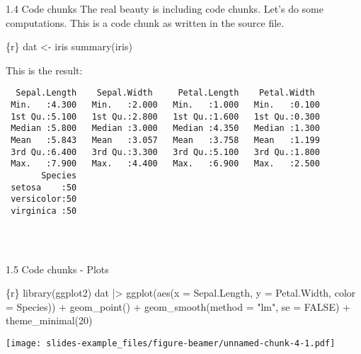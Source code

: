 \documentclass[
  ignorenonframetext,
]{beamer}
\newenvironment{Shaded}{\begin{snugshade}}{\end{snugshade}}
\newcommand{\NormalTok}[1]{\textcolor[rgb]{0.00,0.23,0.31}{#1}}
\begin{document}
\begin{frame}[fragile]{1.4 Code chunks}
\label{code-chunks}
The real beauty is including code chunks. Let's do some computations.
This is a code chunk as written in the source file.

\begin{Shaded}
\begin{Highlighting}[]
\NormalTok{\textasciigrave{}\textasciigrave{}\textasciigrave{}\{r\}}
\NormalTok{dat \textless{}{-} iris}
\NormalTok{summary(iris)}
\NormalTok{\textasciigrave{}\textasciigrave{}\textasciigrave{}}
\end{Highlighting}
\end{Shaded}

This is the result:

\begin{verbatim}
  Sepal.Length    Sepal.Width     Petal.Length    Petal.Width   
 Min.   :4.300   Min.   :2.000   Min.   :1.000   Min.   :0.100  
 1st Qu.:5.100   1st Qu.:2.800   1st Qu.:1.600   1st Qu.:0.300  
 Median :5.800   Median :3.000   Median :4.350   Median :1.300  
 Mean   :5.843   Mean   :3.057   Mean   :3.758   Mean   :1.199  
 3rd Qu.:6.400   3rd Qu.:3.300   3rd Qu.:5.100   3rd Qu.:1.800  
 Max.   :7.900   Max.   :4.400   Max.   :6.900   Max.   :2.500  
       Species  
 setosa    :50  
 versicolor:50  
 virginica :50  
                
                
                
\end{verbatim}
\end{frame}

\begin{frame}[fragile]{1.5 Code chunks - Plots}
\label{code-chunks---plots}
\begin{Shaded}
\begin{Highlighting}[]
\NormalTok{\textasciigrave{}\textasciigrave{}\textasciigrave{}\{r\}}
\NormalTok{library(ggplot2)}
\NormalTok{dat |\textgreater{}}
\NormalTok{    ggplot(aes(x = Sepal.Length, y = Petal.Width, color = Species)) +}
\NormalTok{    geom\_point() +}
\NormalTok{    geom\_smooth(method = "lm", se = FALSE) +}
\NormalTok{    theme\_minimal(20)}
\NormalTok{\textasciigrave{}\textasciigrave{}\textasciigrave{}}
\end{Highlighting}
\end{Shaded}

\begin{center}
\texttt{[image: slides-example\_files/figure-beamer/unnamed-chunk-4-1.pdf]}
\end{center}
\end{frame}
\end{document}
